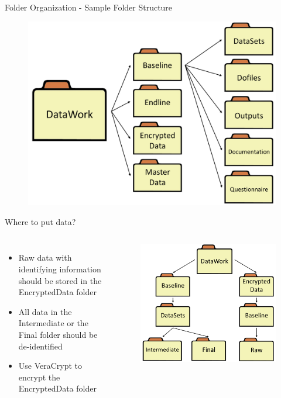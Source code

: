 \documentclass[aspectratio=169]{beamer}
\begin{document}
\begin{frame}{Folder Organization - Sample Folder Structure}
	\begin{figure}
		\centering
		\includegraphics[width=.7\linewidth]{img/folderstructure}
	\end{figure}
\end{frame}

\begin{frame}[fragile]{Where to put data?}
	\begin{columns}[c]
		\begin{itemize}
			\item Raw data with identifying information should be stored in the EncryptedData folder
			\item All data in the Intermediate or the Final folder should be de-identified
			\item Use VeraCrypt to encrypt the EncryptedData folder
		\end{itemize}

		\begin{figure}
			\centering
			\includegraphics[width=\linewidth]{img/folderstructure2}
		\end{figure}
	\end{columns}
\end{frame}
\end{document}
